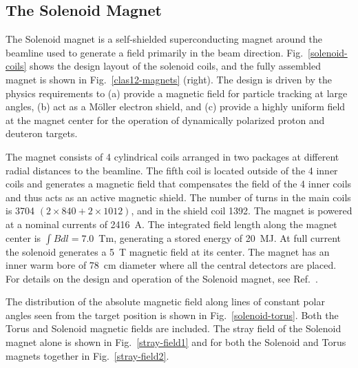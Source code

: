 \documentclass[final,3p,twocolumn]{elsarticle}
\begin{document}
\subsection{The Solenoid Magnet}

The Solenoid magnet is a self-shielded superconducting magnet around the beamline used to generate a field primarily
in the beam direction. Fig.~\ref{solenoid-coils} shows the design layout of the solenoid coils, and the fully assembled
magnet is shown in Fig.~\ref{clas12-magnets} (right). The design is driven by the physics requirements to (a) provide
a magnetic field for particle tracking at large angles, (b) act as a M\"oller electron shield, and (c) provide a highly
uniform field at the magnet center for the operation of dynamically polarized proton and deuteron targets.

The magnet consists of 4 cylindrical coils arranged in two packages at different radial distances to the beamline. The
fifth coil is located outside of the 4 inner coils and generates a magnetic field that compensates the field of the 4 inner
coils and thus acts as an active magnetic shield. The number of turns in the main coils is 3704
$(2 \times 840 + 2 \times 1012)$, and in the shield coil 1392. The magnet is powered at a nominal currents of 2416~A.
The integrated field length along the magnet center is $\int Bdl = 7.0$~Tm, generating a stored energy of 20~MJ. At
full current the solenoid generates a 5~T magnetic field at its center. The magnet has an inner warm bore of 78~cm
diameter where all the central detectors are placed.  For details on the design and operation of the Solenoid magnet,
see Ref.~\cite{clas12-magnets}.

The distribution of the absolute magnetic field along lines of constant polar angles seen from the target position is shown
in Fig.~\ref{solenoid-torus}. Both the Torus and Solenoid magnetic fields are included. The stray field of the Solenoid
magnet alone is shown in Fig.~\ref{stray-field1} and for both the Solenoid and Torus magnets together in
Fig.~\ref{stray-field2}.
 
\end{document}

